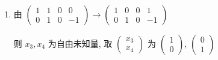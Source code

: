      \paragraph{} %
         \begin{enumerate}
             \item %
                   由 $ \begin{pmatrix}
                           1 & 1 & 0 & 0  \\
                           0 & 1 & 0 & -1
                       \end{pmatrix} \rightarrow \begin{pmatrix}
                           1 & 0 & 0 & 1  \\
                           0 & 1 & 0 & -1
                       \end{pmatrix} $

                   则 $x_{3}, x_{4}$ 为自由未知量, 取 $ \begin{pmatrix}
                           x_{3} \\
                           x_{4}
                       \end{pmatrix} $ 为 $ \begin{pmatrix}
                           1 \\
                           0
                       \end{pmatrix} $, $ \begin{pmatrix}
                           0 \\
                           1
                       \end{pmatrix} $


\end{enumerate}
